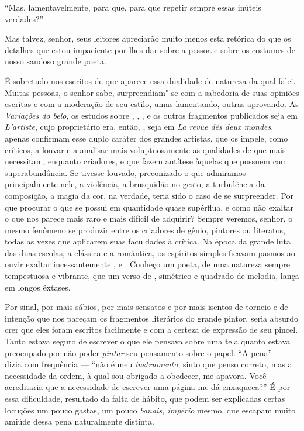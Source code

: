 “Mas, lamentavelmente, para que, para que repetir sempre essas inúteis
verdades?”

Mas talvez, senhor, seus leitores apreciarão muito menos esta retórica
do que os detalhes que estou impaciente por lhes dar sobre a pessoa e
sobre os costumes de nosso saudoso grande poeta.

\sectionitem

É sobretudo nos escritos de  que aparece essa dualidade
de natureza da qual falei. Muitas pessoas, o senhor sabe,
surpreendiam"-se com a sabedoria de suas opiniões escritas e com a
moderação de seu estilo, umas lamentando, outras aprovando. As
\textit{Variações do belo}, os estudos sobre , ,
, e os outros fragmentos publicados seja em \textit{L’artiste}, 
cujo proprietário era, então, , seja em \textit{La revue dês
deux mondes}, apenas confirmam esse duplo caráter dos grandes artistas,
que os impele, como críticos, a louvar e a analisar mais
voluptuosamente as qualidades de que mais necessitam, enquanto
criadores, e que fazem antítese àquelas que possuem com
superabundância. Se  tivesse louvado, preconizado o que
admiramos principalmente nele, a violência, a brusquidão no gesto, a
turbulência da composição, a magia da cor, na verdade, teria sido o
caso de se surpreender. Por que procurar o que se possui em quantidade
quase supérflua, e como não exaltar o que nos parece mais raro e mais
difícil de adquirir? Sempre veremos, senhor, o mesmo fenômeno se
produzir entre os criadores de gênio, pintores ou literatos, todas as
vezes que aplicarem suas faculdades à crítica. Na época da grande luta
das duas escolas, a clássica e a romântica, os espíritos simples
ficavam pasmos ao ouvir  exaltar incessantemente
,  e . Conheço um poeta, de uma natureza sempre
tempestuosa e vibrante, que um verso de , simétrico e quadrado
de melodia, lança em longos êxtases.

Por sinal, por mais sábios, por mais sensatos e por mais isentos de
torneio e de intenção que nos pareçam os fragmentos literários do
grande pintor, seria absurdo crer que eles foram escritos facilmente e
com a certeza de expressão de seu pincel. Tanto estava seguro de
escrever o que ele pensava sobre uma tela quanto estava preocupado por
não poder \textit{pintar} seu pensamento sobre o papel. “A pena” ---
dizia com frequência --- “não é meu \textit{instrumento}; sinto que penso
correto, mas a necessidade da ordem, à qual sou obrigado a obedecer, me
apavora. Você acreditaria que a necessidade de escrever uma página me
dá enxaqueca?” É por essa dificuldade, resultado da falta de hábito,
que podem ser explicadas certas locuções um pouco gastas, um pouco
\textit{banais, império} mesmo, que escapam muito amiúde dessa pena
naturalmente distinta.

